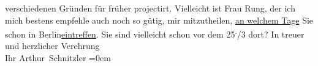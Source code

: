 \begin{ledgroupsized}[t]{13cm}
               verschiedenen Gründen für früher projectirt. Vielleicht ist Frau Rung, der ich mich bestens empfehle auch noch so gütig, mir
               mitzutheilen, \uline{an welchem Tage} Sie schon in Berlin\uline{eintreffen}. Sie sind vielleicht schon vor dem 25\substVorne{}\textsuperscript{.}\substDazwischen{}/3\substHinten{} dort?\pend
           \pstart
           In treuer und herzlicher Verehrung{\\[\baselineskip]}Ihr \spacefill\mbox{Arthur Schnitzler}\pend
           \leftskip=0em{}
         
         \endnumbering{}\end{ledgroupsized}  \newcommand{\dateiname}{L02434}\newcommand{\titel}{Arthur Schnitzler an Georg Brandes, 22. 2. 1925}\newcommand{\editorInnen}{Martin Anton Müller und Gerd-Hermann Susen}
      